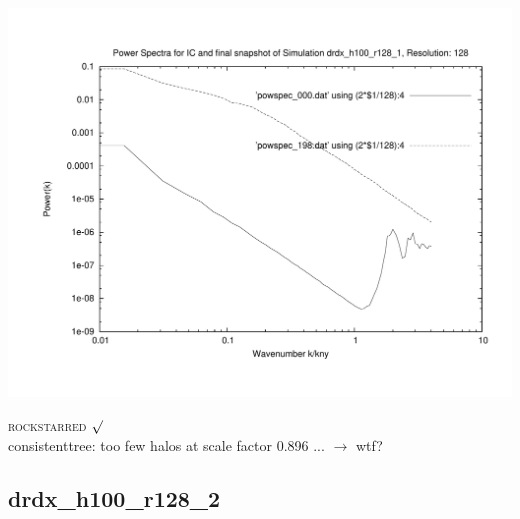 \includegraphics[scale=0.5]{r128/drdx_h100_r128_1/plot_powspec_drdx_h100_r128_1.pdf}


\textsc{rockstarred} $\surd$  \\
consistenttree: too few halos at scale factor 0.896 ... $\rightarrow$ wtf? 

\newpage
\subsection{drdx\_h100\_r128\_2}

